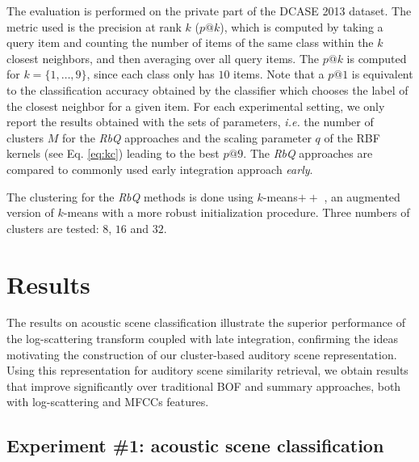 \documentclass[journal]{IEEEtran}
\newcommand{\ja}[1]{\textcolor{magenta}{Joakim : #1}}
\begin{document}
The evaluation is performed on the private part of the DCASE 2013 dataset. The metric used is the precision at rank $k$ ($p@k$), which is computed by taking a query item and counting the number of items of the same class within the $k$ closest neighbors, and then averaging over all query items. The $p@k$ is computed for $k=\lbrace 1,\ldots,9\rbrace$, since each class only has $10$ items. Note that a $p@1$ is equivalent to the classification accuracy obtained by the classifier which chooses the label of the closest neighbor for a given item. For each experimental setting, we only report the results obtained with the sets of parameters, \emph{i.e.} the number of clusters $M$ for the \emph{RbQ} approaches and the scaling parameter $q$ of the RBF kernels (see Eq. \ref{eq:kc}) leading to the best $p@9$. The \emph{RbQ} approaches are compared to commonly used early integration approach \emph{early}. %

The clustering for the \emph{RbQ} methods is done using $k$-means$++$ \cite{arthur2007k}, an augmented version of $k$-means with a more robust initialization procedure. Three numbers of clusters are tested: $8$, $16$ and $32$.


\section{Results \label{sec:results}}

The results on acoustic scene classification illustrate the superior performance of the log-scattering transform coupled with late integration, confirming the ideas motivating the construction of our cluster-based auditory scene representation. Using this representation for auditory scene similarity retrieval, we obtain results that improve significantly over traditional BOF and summary approaches, both with log-scattering and MFCCs features.

\subsection{Experiment \#1: acoustic scene classification}

\end{document}
